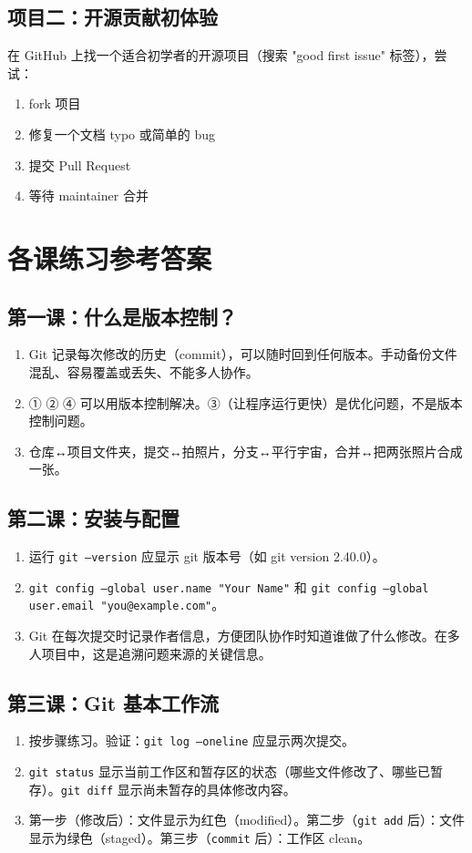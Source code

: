 \documentclass[a4paper,12pt]{ctexart}
\begin{document}
\subsection*{项目二：开源贡献初体验}

在 GitHub 上找一个适合初学者的开源项目（搜索 "good first issue" 标签），尝试：
\begin{enumerate}
  \item fork 项目
  \item 修复一个文档 typo 或简单的 bug
  \item 提交 Pull Request
  \item 等待 maintainer 合并
\end{enumerate}

\section*{\textcolor{blue!70!black}{各课练习参考答案}}

\subsection*{第一课：什么是版本控制？}
\begin{enumerate}
  \item Git 记录每次修改的历史（commit），可以随时回到任何版本。手动备份文件混乱、容易覆盖或丢失、不能多人协作。
  \item ① ② ④ 可以用版本控制解决。③（让程序运行更快）是优化问题，不是版本控制问题。
  \item 仓库↔项目文件夹，提交↔拍照片，分支↔平行宇宙，合并↔把两张照片合成一张。
\end{enumerate}

\subsection*{第二课：安装与配置}
\begin{enumerate}
  \item 运行 \texttt{git --version} 应显示 git 版本号（如 git version 2.40.0）。
  \item \texttt{git config --global user.name "Your Name"} 和 \texttt{git config --global user.email "you@example.com"}。
  \item Git 在每次提交时记录作者信息，方便团队协作时知道谁做了什么修改。在多人项目中，这是追溯问题来源的关键信息。
\end{enumerate}

\subsection*{第三课：Git 基本工作流}
\begin{enumerate}
  \item 按步骤练习。验证：\texttt{git log --oneline} 应显示两次提交。
  \item \texttt{git status} 显示当前工作区和暂存区的状态（哪些文件修改了、哪些已暂存）。\texttt{git diff} 显示尚未暂存的具体修改内容。
  \item 第一步（修改后）：文件显示为红色（modified）。第二步（\texttt{git add} 后）：文件显示为绿色（staged）。第三步（\texttt{commit} 后）：工作区 clean。
\end{enumerate}
\end{document}
